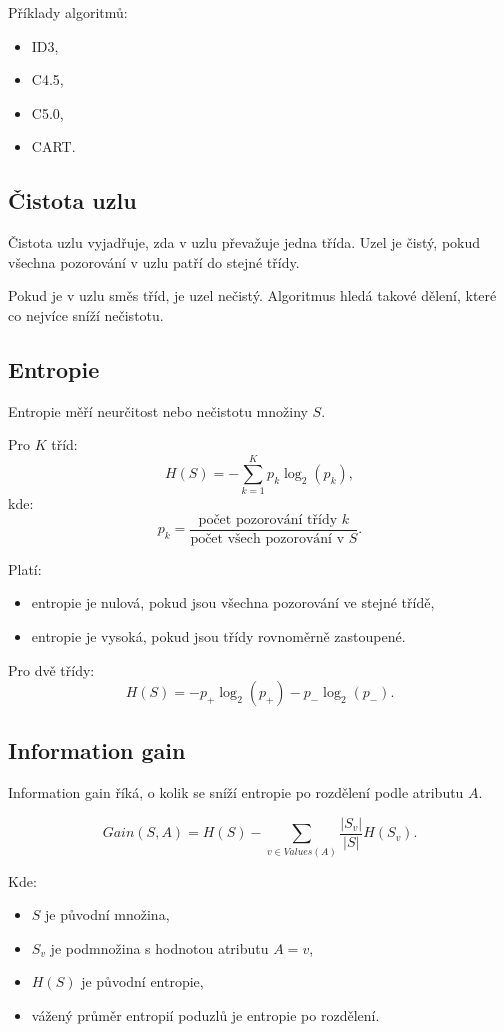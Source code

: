 Příklady algoritmů:
\begin{itemize}
    \item ID3,
    \item C4.5,
    \item C5.0,
    \item CART.
\end{itemize}

\subsection{Čistota uzlu}

Čistota uzlu vyjadřuje, zda v uzlu převažuje jedna třída. Uzel je čistý, pokud všechna pozorování v uzlu
patří do stejné třídy.

Pokud je v uzlu směs tříd, je uzel nečistý. Algoritmus hledá takové dělení, které co nejvíce sníží nečistotu.

\subsection{Entropie}

Entropie měří neurčitost nebo nečistotu množiny $S$.

Pro $K$ tříd:
\[
H(S)=
-\sum_{k=1}^K p_k\log_2(p_k),
\]
kde:
\[
p_k=\frac{\text{počet pozorování třídy } k}{\text{počet všech pozorování v } S}.
\]

Platí:
\begin{itemize}
    \item entropie je nulová, pokud jsou všechna pozorování ve stejné třídě,
    \item entropie je vysoká, pokud jsou třídy rovnoměrně zastoupené.
\end{itemize}

Pro dvě třídy:
\[
H(S)=
-p_+\log_2(p_+)-p_-\log_2(p_-).
\]

\subsection{Information gain}

Information gain říká, o kolik se sníží entropie po rozdělení podle atributu $A$.

\[
Gain(S,A)
=
H(S)
-
\sum_{v\in Values(A)}
\frac{|S_v|}{|S|}
H(S_v).
\]

Kde:
\begin{itemize}
    \item $S$ je původní množina,
    \item $S_v$ je podmnožina s hodnotou atributu $A=v$,
    \item $H(S)$ je původní entropie,
    \item vážený průměr entropií poduzlů je entropie po rozdělení.
\end{itemize}

